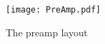  \begin{figure}[h]
	\centering
		\texttt{[image: PreAmp.pdf]}
		\caption{The \gls{preamp} layout}
		\label{fig:preamp_layout}
\end{figure}

 